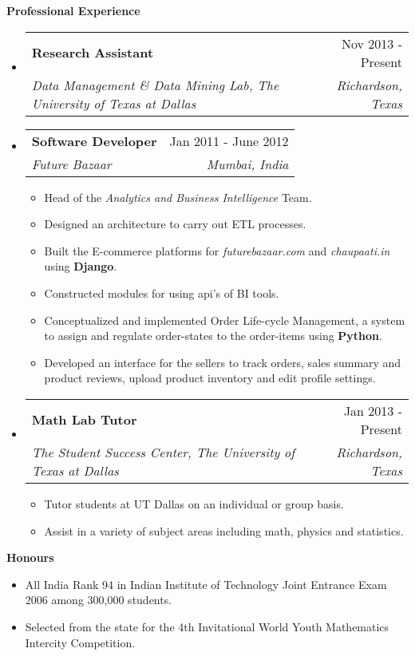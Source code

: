 \documentclass[letterpaper,11pt]{article}
\makeatletter
\newcommand{\resitem}[1]{\item[\ding{226}] #1 \vspace{-2pt}}
\newcommand{\resheading}[1]{{\large \colorbox{mygrey}{\begin{minipage}{\textwidth}{\textbf{#1 \vphantom{p\^{E}}}}\end{minipage}}}}
\newcommand{\ressubheading}[4]{
\begin{tabular*}{7.0in}{l@{\extracolsep{\fill}}r}
		\textbf{#1} & #2 \\
		\textit{#3} & \textit{#4} \\
\end{tabular*}\vspace{-6pt}}
\makeatother
\begin{document}
\resheading{Professional Experience}
\begin{itemize}

\item
	\ressubheading{Research Assistant}{Nov 2013 - Present}{Data Management \& Data Mining Lab, The University of Texas at Dallas}{Richardson, Texas}

\item
	\ressubheading{Software Developer}{Jan 2011 - June 2012}{Future Bazaar}{Mumbai, India}
	\begin{itemize}
		\resitem{Head of the \textit{Analytics and Business Intelligence} Team. }
		\resitem{Designed an architecture to carry out ETL processes.}%
		\resitem{Built the E-commerce platforms for \textit{futurebazaar.com} and \textit{chaupaati.in} using \textbf{Django}.}
		\resitem{Constructed modules for using api's of BI tools.}%
		\resitem{Conceptualized and implemented Order Life-cycle Management, a system to assign and regulate order-states to the order-items using \textbf{Python}.}
		\resitem{Developed an interface for the sellers to track orders, sales summary and product reviews, upload product inventory and edit profile settings.}
	\end{itemize}

\item
	\ressubheading{Math Lab Tutor}{Jan 2013 - Present}{The Student Success Center, The University of Texas at Dallas}{Richardson, Texas} 
	\begin{itemize}
		\resitem{Tutor students at UT Dallas on an individual or group basis.}
        \resitem{Assist in a variety of subject areas including math, physics and statistics.}
	\end{itemize}
\end{itemize}

\resheading{Honours}
\begin{itemize}

\item{All India Rank 94 in Indian Institute of Technology Joint Entrance Exam 2006 among 300,000 students.}
\item{Selected from the state for the 4th Invitational World Youth Mathematics Intercity Competition.}

\end{itemize}
\end{document}
